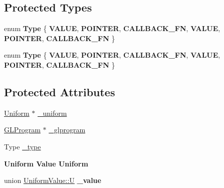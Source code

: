 \subsection*{Protected Types}
\begin{DoxyCompactItemize}
\item 
\mbox{\label{classUniformValue_a554303fa2942dc28eca8035077ad46af}} 
enum {\bfseries Type} \{ \newline
{\bfseries V\+A\+L\+UE}, 
{\bfseries P\+O\+I\+N\+T\+ER}, 
{\bfseries C\+A\+L\+L\+B\+A\+C\+K\+\_\+\+FN}, 
{\bfseries V\+A\+L\+UE}, 
\newline
{\bfseries P\+O\+I\+N\+T\+ER}, 
{\bfseries C\+A\+L\+L\+B\+A\+C\+K\+\_\+\+FN}
 \}
\item 
\mbox{\label{classUniformValue_a554303fa2942dc28eca8035077ad46af}} 
enum {\bfseries Type} \{ \newline
{\bfseries V\+A\+L\+UE}, 
{\bfseries P\+O\+I\+N\+T\+ER}, 
{\bfseries C\+A\+L\+L\+B\+A\+C\+K\+\_\+\+FN}, 
{\bfseries V\+A\+L\+UE}, 
\newline
{\bfseries P\+O\+I\+N\+T\+ER}, 
{\bfseries C\+A\+L\+L\+B\+A\+C\+K\+\_\+\+FN}
 \}
\end{DoxyCompactItemize}
\subsection*{Protected Attributes}
\begin{DoxyCompactItemize}
\item 
\hyperlink{structUniform}{Uniform} $\ast$ \hyperlink{classUniformValue_a6767cfe53473b732f6d35e9c51e3420e}{\+\_\+uniform}
\item 
\hyperlink{classGLProgram}{G\+L\+Program} $\ast$ \hyperlink{classUniformValue_ab00f2e9c022f1318f6dc708c5e82fa65}{\+\_\+glprogram}
\item 
Type \hyperlink{classUniformValue_a0438b9746276d6e62bb5969bad9402fc}{\+\_\+type}
\end{DoxyCompactItemize}
\begin{Indent}\textbf{ Uniform Value Uniform}\par
\begin{DoxyCompactItemize}
\item 
\mbox{\label{classUniformValue_a738233f25c8d364678d152eaf8f2417b}} 
union \hyperlink{unionUniformValue_1_1U}{Uniform\+Value\+::U} {\bfseries \+\_\+value}
\end{DoxyCompactItemize}
\end{Indent}
